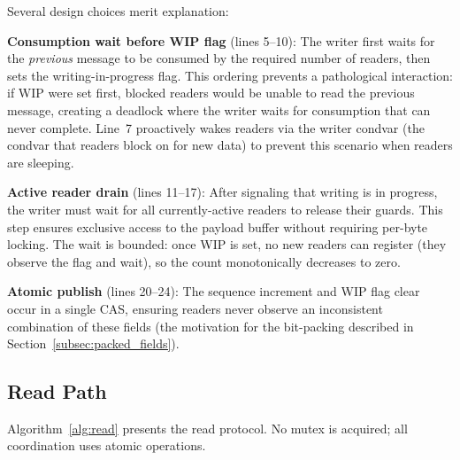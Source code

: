Several design choices merit explanation:

\textbf{Consumption wait before WIP flag} (lines 5--10): The writer first waits for the \emph{previous} message to be consumed by the required number of readers, then sets the writing-in-progress flag. This ordering prevents a pathological interaction: if WIP were set first, blocked readers would be unable to read the previous message, creating a deadlock where the writer waits for consumption that can never complete. Line~7 proactively wakes readers via the writer condvar (the condvar that readers block on for new data) to prevent this scenario when readers are sleeping.

\textbf{Active reader drain} (lines 11--17): After signaling that writing is in progress, the writer must wait for all currently-active readers to release their guards. This step ensures exclusive access to the payload buffer without requiring per-byte locking. The wait is bounded: once WIP is set, no new readers can register (they observe the flag and wait), so the count monotonically decreases to zero.

\textbf{Atomic publish} (lines 20--24): The sequence increment and WIP flag clear occur in a single CAS, ensuring readers never observe an inconsistent combination of these fields (the motivation for the bit-packing described in Section~\ref{subsec:packed_fields}).

\newpage
\subsection{Read Path}
\label{subsec:read_path}

Algorithm~\ref{alg:read} presents the read protocol. No mutex is acquired; all coordination uses atomic operations.

